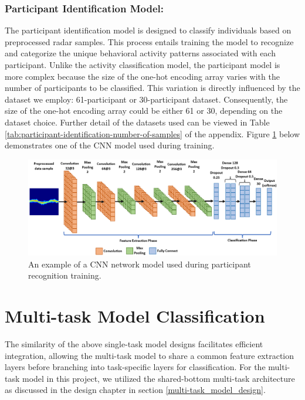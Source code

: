 \documentclass{l4proj}
\begin{document}
\subsubsection{Participant Identification Model:}
The participant identification model is designed to classify individuals based on preprocessed radar samples. This process entails training the model to recognize and categorize the unique behavioral activity patterns associated with each participant. Unlike the activity classification model, the participant model is more complex because the size of the one-hot encoding array varies with the number of participants to be classified. This variation is directly influenced by the dataset we employ: 61-participant or 30-participant dataset. Consequently, the size of the one-hot encoding array could be either 61 or 30, depending on the dataset choice. Further detail of the datasets used can be viewed in Table \ref{tab:participant-identification-number-of-samples} of the appendix. Figure \ref{fig:participant-recognition-model} below demonstrates one of the CNN model used during training.

\begin{figure}[h]
    \centering
    \includegraphics[width=1.1\linewidth]{images/participant-recognition-model.png}
    \caption{An example of a CNN network model used during participant recognition training.}
    \label{fig:participant-recognition-model}
\end{figure}

\section{Multi-task Model Classification}
The similarity of the above single-task model designs facilitates efficient integration, allowing the multi-task model to share a common feature extraction layers before branching into task-specific layers for classification. For the multi-task model in this project, we utilized the shared-bottom multi-task architecture as discussed in the design chapter in section \ref{multi-task_model_design}.
\end{document}
